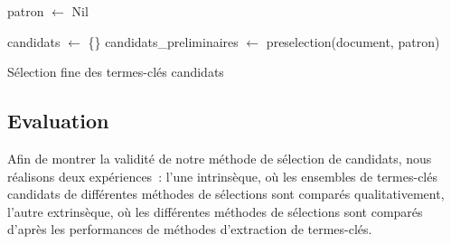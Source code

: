         \begin{algorithm}[h!]
          \DontPrintSemicolon{}

          \BlankLine

          patron $\leftarrow$ Nil\;\label{algo:line:start_preselection}

          candidats $\leftarrow$ \{\}\;
          candidats\_preliminaires $\leftarrow$ preselection(document, patron)\;\label{algo:line:end_preselection}

          \label{algo:line:end_filtering}


          \caption{Sélection fine des termes-clés candidats
                   \label{algo:candidate_pruning}}
        \end{algorithm}

    \subsection{Evaluation}
    \label{subsec:main-automatic_keyphrase_annotation-keyphrase_candidate_selection-evaluation}
      Afin de montrer la validité de notre méthode de sélection de candidats,
      nous réalisons deux expériences~: l'une intrinsèque, où les ensembles de
      termes-clés candidats de différentes méthodes de sélections sont comparés
      qualitativement, l'autre extrinsèque, où les différentes méthodes de
      sélections sont comparés d'après les performances de méthodes d'extraction
      de termes-clés.

